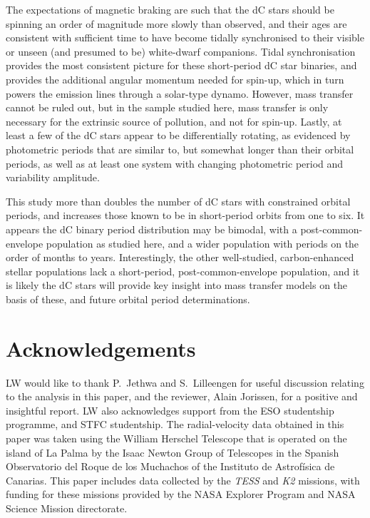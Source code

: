 \documentclass[fleqn,usenatbib,useAMS]{mnras}
\begin{document}
The expectations of magnetic braking are such that the dC stars should be spinning an order of magnitude more slowly than observed, and their ages are consistent with sufficient time to have become tidally synchronised to their visible or unseen (and presumed to be) white-dwarf companions.  Tidal synchronisation provides the most consistent picture for these short-period dC star binaries, and provides the additional angular momentum needed for spin-up, which in turn powers the emission lines through a solar-type dynamo.  However, mass transfer cannot be ruled out, but in the sample studied here, mass transfer is only necessary for the extrinsic source of pollution, and not for spin-up.  Lastly, at least a few of the dC stars appear to be differentially rotating, as evidenced by photometric periods that are similar to, but somewhat longer than their orbital periods, as well as at least one system with changing photometric period and variability amplitude.

This study more than doubles the number of dC stars with constrained orbital periods, and increases those known to be in short-period orbits from one to six.  It appears the dC binary period distribution may be bimodal, with a post-common-envelope population as studied here, and a wider population with periods on the order of months to years.  Interestingly, the other well-studied, carbon-enhanced stellar populations lack a short-period, post-common-envelope population, and it is likely the dC stars will provide key insight into mass transfer models on the basis of these, and future orbital period determinations.


\section*{Acknowledgements}

LW would like to thank P.~Jethwa and S.~Lilleengen for useful discussion relating to the analysis in this paper, and the reviewer, Alain Jorissen, for a positive and insightful report. LW also acknowledges support from the ESO studentship programme, and STFC studentship.  The radial-velocity data obtained in this paper was taken using the William Herschel Telescope that is operated on the island of La Palma by the Isaac Newton Group of Telescopes in the Spanish Observatorio del Roque de los Muchachos of the Instituto de Astrof\'isica de Canarias.  This paper includes data collected by the {\em TESS} and \textit{K2} missions, with funding for these missions provided by the NASA Explorer Program and NASA Science Mission directorate.
\end{document}
